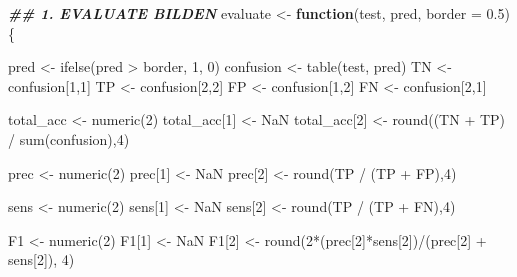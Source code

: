 \documentclass[a4paper, nobind]{templates/ociamthesis}
\newenvironment{Shaded}{\begin{snugshade}}{\end{snugshade}}
\newcommand{\AttributeTok}[1]{\textcolor[rgb]{0.77,0.63,0.00}{#1}}
\newcommand{\ConstantTok}[1]{\textcolor[rgb]{0.00,0.00,0.00}{#1}}
\newcommand{\ControlFlowTok}[1]{\textcolor[rgb]{0.13,0.29,0.53}{\textbf{#1}}}
\newcommand{\DecValTok}[1]{\textcolor[rgb]{0.00,0.00,0.81}{#1}}
\newcommand{\DocumentationTok}[1]{\textcolor[rgb]{0.56,0.35,0.01}{\textbf{\textit{#1}}}}
\newcommand{\FloatTok}[1]{\textcolor[rgb]{0.00,0.00,0.81}{#1}}
\newcommand{\FunctionTok}[1]{\textcolor[rgb]{0.00,0.00,0.00}{#1}}
\newcommand{\NormalTok}[1]{#1}
\newcommand{\OtherTok}[1]{\textcolor[rgb]{0.56,0.35,0.01}{#1}}
\newcommand{\SpecialCharTok}[1]{\textcolor[rgb]{0.00,0.00,0.00}{#1}}
\renewenvironment{Shaded}
{
  \vspace{10pt}%
  \begin{snugshade}%
}{%
  \end{snugshade}%
  \vspace{8pt}%
}
\begin{document}
\begin{Shaded}
\begin{Highlighting}[]
\DocumentationTok{\#\# 1. EVALUATE BILDEN}
\NormalTok{evaluate }\OtherTok{\textless{}{-}} \ControlFlowTok{function}\NormalTok{(test, pred, }\AttributeTok{border =} \FloatTok{0.5}\NormalTok{)\{}
  
\NormalTok{  pred }\OtherTok{\textless{}{-}} \FunctionTok{ifelse}\NormalTok{(pred }\SpecialCharTok{\textgreater{}}\NormalTok{ border, }\DecValTok{1}\NormalTok{, }\DecValTok{0}\NormalTok{)}
\NormalTok{  confusion }\OtherTok{\textless{}{-}} \FunctionTok{table}\NormalTok{(test, pred)}
\NormalTok{  TN }\OtherTok{\textless{}{-}}\NormalTok{ confusion[}\DecValTok{1}\NormalTok{,}\DecValTok{1}\NormalTok{]}
\NormalTok{  TP }\OtherTok{\textless{}{-}}\NormalTok{ confusion[}\DecValTok{2}\NormalTok{,}\DecValTok{2}\NormalTok{]}
\NormalTok{  FP }\OtherTok{\textless{}{-}}\NormalTok{ confusion[}\DecValTok{1}\NormalTok{,}\DecValTok{2}\NormalTok{]}
\NormalTok{  FN }\OtherTok{\textless{}{-}}\NormalTok{ confusion[}\DecValTok{2}\NormalTok{,}\DecValTok{1}\NormalTok{]}

\NormalTok{  total\_acc }\OtherTok{\textless{}{-}} \FunctionTok{numeric}\NormalTok{(}\DecValTok{2}\NormalTok{)}
\NormalTok{  total\_acc[}\DecValTok{1}\NormalTok{] }\OtherTok{\textless{}{-}} \ConstantTok{NaN}
\NormalTok{  total\_acc[}\DecValTok{2}\NormalTok{] }\OtherTok{\textless{}{-}} \FunctionTok{round}\NormalTok{((TN }\SpecialCharTok{+}\NormalTok{ TP) }\SpecialCharTok{/} \FunctionTok{sum}\NormalTok{(confusion),}\DecValTok{4}\NormalTok{)}

\NormalTok{  prec }\OtherTok{\textless{}{-}} \FunctionTok{numeric}\NormalTok{(}\DecValTok{2}\NormalTok{)}
\NormalTok{  prec[}\DecValTok{1}\NormalTok{] }\OtherTok{\textless{}{-}} \ConstantTok{NaN}
\NormalTok{  prec[}\DecValTok{2}\NormalTok{] }\OtherTok{\textless{}{-}} \FunctionTok{round}\NormalTok{(TP }\SpecialCharTok{/}\NormalTok{ (TP }\SpecialCharTok{+}\NormalTok{ FP),}\DecValTok{4}\NormalTok{)}
  
\NormalTok{  sens }\OtherTok{\textless{}{-}} \FunctionTok{numeric}\NormalTok{(}\DecValTok{2}\NormalTok{)}
\NormalTok{  sens[}\DecValTok{1}\NormalTok{] }\OtherTok{\textless{}{-}} \ConstantTok{NaN}
\NormalTok{  sens[}\DecValTok{2}\NormalTok{] }\OtherTok{\textless{}{-}} \FunctionTok{round}\NormalTok{(TP }\SpecialCharTok{/}\NormalTok{ (TP }\SpecialCharTok{+}\NormalTok{ FN),}\DecValTok{4}\NormalTok{)}
  
\NormalTok{  F1 }\OtherTok{\textless{}{-}} \FunctionTok{numeric}\NormalTok{(}\DecValTok{2}\NormalTok{)}
\NormalTok{  F1[}\DecValTok{1}\NormalTok{] }\OtherTok{\textless{}{-}} \ConstantTok{NaN}
\NormalTok{  F1[}\DecValTok{2}\NormalTok{] }\OtherTok{\textless{}{-}} \FunctionTok{round}\NormalTok{(}\DecValTok{2}\SpecialCharTok{*}\NormalTok{(prec[}\DecValTok{2}\NormalTok{]}\SpecialCharTok{*}\NormalTok{sens[}\DecValTok{2}\NormalTok{])}\SpecialCharTok{/}\NormalTok{(prec[}\DecValTok{2}\NormalTok{] }\SpecialCharTok{+}\NormalTok{ sens[}\DecValTok{2}\NormalTok{]), }\DecValTok{4}\NormalTok{)}


\end{Highlighting}
\end{Shaded}
\end{document}

